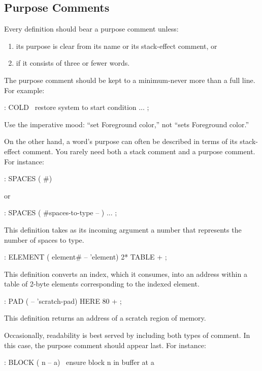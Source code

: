 \subsection{Purpose Comments}%

\begin{tip}
Every definition should bear a purpose comment unless:
\medskip
\begin{enumerate}
\item its purpose is clear from its name or its stack-effect comment, or
\item if it consists of three or fewer words.
\end{enumerate}
\end{tip}
The purpose comment should be kept to a minimum-never more than a full
line.  For example:
\begin{Code}
: COLD   \ restore system to start condition
    ... ;
\end{Code}
Use the imperative mood: ``set Foreground color,'' not ``sets
Foreground color.''

On the other hand, a word's purpose can often be described in terms of
its stack-effect comment.  You rarely need both a stack comment and a
purpose comment.  For instance:
\begin{Code}
: SPACES  ( #)
\end{Code}
or
\begin{Code}
: SPACES  ( #spaces-to-type -- )   ... ;
\end{Code}
This definition takes as its incoming argument a number that
represents the number of spaces to type.
\begin{Code}
: ELEMENT  ( element# -- 'element)  2*  TABLE + ;
\end{Code}
This definition converts an index, which it consumes, into an address
within a table of 2-byte elements corresponding to the indexed element.
\begin{Code}
: PAD  ( -- 'scratch-pad)  HERE  80 + ;
\end{Code}
This definition returns an address of a scratch region of memory.

Occasionally, readability is best served by including both types of
comment. In this case, the purpose comment should appear last.  For
instance:
\begin{Code}
: BLOCK  ( n -- a)  \   ensure block n in buffer at a
\end{Code}

